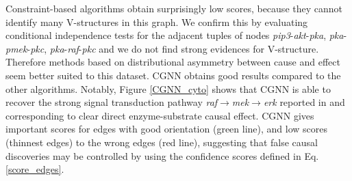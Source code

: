 \documentclass[a4paper, 11pt]{article}
\begin{document}
 Constraint-based algorithms obtain surprisingly low scores, because they cannot identify many V-structures in this graph. We confirm this by evaluating conditional independence tests for the adjacent tuples of nodes \textit{pip3}-\textit{akt}-\textit{pka}, \textit{pka}-\textit{pmek}-\textit{pkc}, \textit{pka}-\textit{raf}-\textit{pkc} and we do not find strong evidences for V-structure. Therefore methods based on distributional asymmetry between cause and effect seem better suited to this dataset. CGNN obtains good results compared to the other algorithms. Notably, Figure \ref{CGNN_cyto} shows that CGNN is able to recover the strong signal transduction pathway \textit{raf}$\rightarrow$\textit{mek}$\rightarrow$\textit{erk} reported in \cite{sachs2005causal} and corresponding to clear direct enzyme-substrate causal effect. CGNN gives important scores for edges with good orientation (green line), and low scores (thinnest edges) to the wrong edges (red line), suggesting that false causal discoveries may be controlled by using the confidence scores defined in Eq. \eqref{score_edges}.
  
\end{document}
